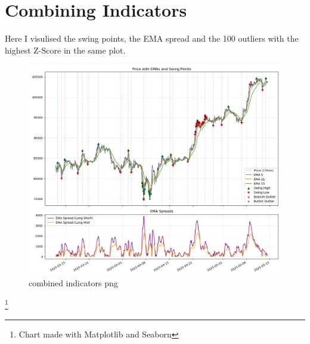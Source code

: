 \documentclass[12pt]{article}
\begin{document}
\newpage

\section*{Combining Indicators}
Here I visulised the swing points, the EMA spread and the 100 outliers with the highest Z-Score in the same plot.

\begin{figure}[H]
    \centering
    \includegraphics[width=\textwidth]{imgs/swingpoints_emaspread_priceOutliers.png}
    \caption{combined indicators png}
\end{figure}

\footnote{Chart made with Matplotlib and Seaborn}
\end{document}
